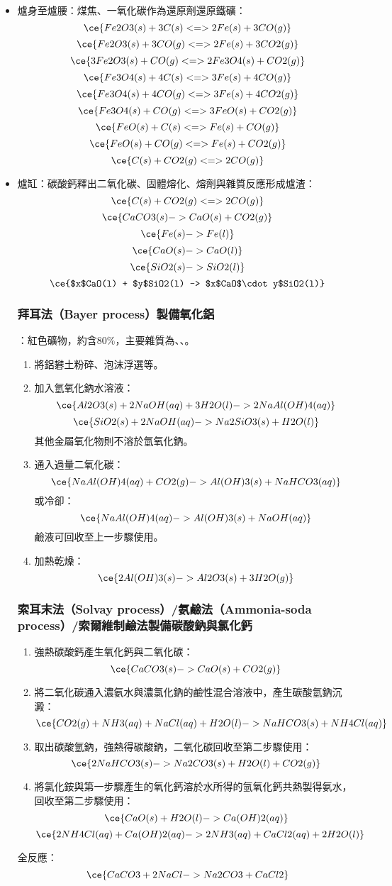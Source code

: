 \documentclass[a4paper,12pt]{report}
\begin{document}
\begin{itemize}
\begin{itemize}
\item 爐身至爐腰：煤焦、一氧化碳作為還原劑還原鐵礦：
\[\ce{Fe2O3(s) + 3C(s) <=> 2Fe(s) + 3CO(g)}\]
\[\ce{Fe2O3(s) + 3CO(g) <=> 2Fe(s) + 3CO2(g)}\]
\[\ce{3Fe2O3(s) + CO(g) <=> 2Fe3O4(s) + CO2(g)}\]
\[\ce{Fe3O4(s) + 4C(s) <=> 3Fe(s) + 4CO(g)}\]
\[\ce{Fe3O4(s) + 4CO(g) <=> 3Fe(s) + 4CO2(g)}\]
\[\ce{Fe3O4(s) + CO(g) <=> 3FeO(s) + CO2(g)}\]
\[\ce{FeO(s) + C(s) <=> Fe(s) + CO(g)}\]
\[\ce{FeO(s) + CO(g) <=> Fe(s) + CO2(g)}\]
\[\ce{C(s) + CO2(g) <=> 2CO(g)}\]
\item 爐缸：碳酸鈣釋出二氧化碳、固體熔化、熔劑與雜質反應形成爐渣：
\[\ce{C(s) + CO2(g) <=> 2CO(g)}\]
\[\ce{CaCO3(s) -> CaO(s) + CO2(g)}\]
\[\ce{Fe(s) -> Fe(l)}\]
\[\ce{CaO(s) -> CaO(l)}\]
\[\ce{SiO2(s) -> SiO2(l)}\]
\[\ce{$x$CaO(l) + $y$SiO2(l) -> $x$CaO$\cdot y$SiO2(l)}\]
\eit
{}
\subsubsection{拜耳法（Bayer process）製備氧化鋁}
：紅色礦物，約含80\%，主要雜質為、、。
\begin{enumerate}
\item 將鋁礬土粉碎、泡沫浮選等。
\item 加入氫氧化鈉水溶液：
\[\ce{Al2O3(s) + 2NaOH(aq) + 3H2O(l) -> 2NaAl(OH)4(aq)}\]
\[\ce{SiO2(s) + 2NaOH(aq) -> Na2SiO3(s) + H2O(l)}\]
其他金屬氧化物則不溶於氫氧化鈉。
\item 通入過量二氧化碳：
\[\ce{NaAl(OH)4(aq) + CO2(g) -> Al(OH)3(s) + NaHCO3(aq)}\]
或冷卻：
\[\ce{NaAl(OH)4(aq) -> Al(OH)3(s) + NaOH(aq)}\]
鹼液可回收至上一步驟使用。
\item 加熱乾燥：
\[\ce{2Al(OH)3(s) -> Al2O3(s) + 3H2O(g)}\]
\end{enumerate}
\subsubsection{索耳末法（Solvay process）/氨鹼法（Ammonia-soda process）/索爾維制鹼法製備碳酸鈉與氯化鈣}
\begin{enumerate}
\item 強熱碳酸鈣產生氧化鈣與二氧化碳：
\[\ce{CaCO3(s) -> CaO(s) + CO2(g)}\]
\item 將二氧化碳通入濃氨水與濃氯化鈉的鹼性混合溶液中，產生碳酸氫鈉沉澱：
\[\ce{CO2(g) + NH3(aq) + NaCl(aq) + H2O(l) -> NaHCO3(s) + NH4Cl(aq)}\]
\item 取出碳酸氫鈉，強熱得碳酸鈉，二氧化碳回收至第二步驟使用：
\[\ce{2NaHCO3(s) -> Na2CO3(s) + H2O(l) + CO2(g)}\]
\item 將氯化銨與第一步驟產生的氧化鈣溶於水所得的氫氧化鈣共熱製得氨水，回收至第二步驟使用：
\[\ce{CaO(s) + H2O(l) -> Ca(OH)2(aq)}\]
\[\ce{2NH4Cl(aq) + Ca(OH)2(aq) -> 2NH3(aq) + CaCl2(aq) + 2H2O(l)}\]
\end{enumerate}
全反應：
\[\ce{CaCO3 + 2NaCl -> Na2CO3 + CaCl2}\]

\end{itemize}
\end{itemize}
\end{document}
